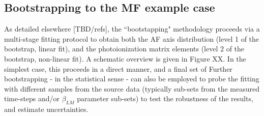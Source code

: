 \subsection{Bootstrapping to the MF example case}

As detailed elsewhere [TBD/refs], the ``bootstapping" methodology proceeds via a multi-stage fitting protocol to obtain both the AF axis distribution (level 1 of the bootstrap, linear fit), and the photoionization matrix elements (level 2 of the bootstrap, non-linear fit). A schematic overview is given in Figure XX. In the simplest case, this proceeds in a direct manner, and a final set of Further bootstrapping - in the statistical sense - can also be employed to probe the fitting with different samples from the source data (typically sub-sets from the measured time-steps and/or $\beta_{LM}$ parameter sub-sets) to test the robustness of the results, and estimate uncertainties.